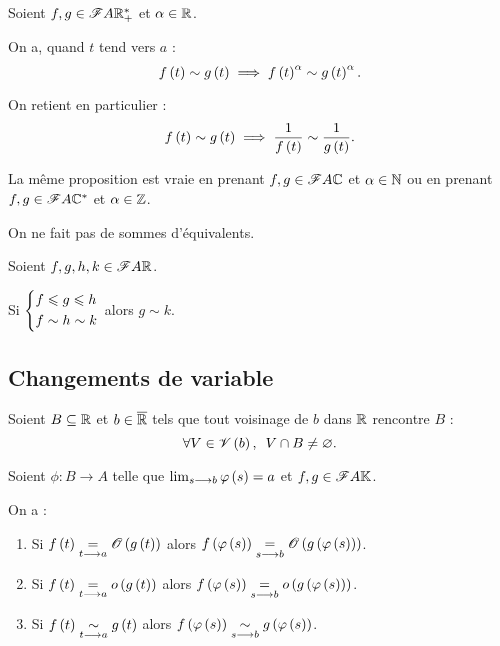 \begin{prop}[Puissances]
Soient \(f,g\in\F{A}{\Rps}\) et \(\alpha\in\R\).

On a, quand \(t\) tend vers \(a\) : \[f\paren{t}\sim g\paren{t}\imp f\paren{t}^\alpha\sim g\paren{t}^\alpha.\]

On retient en particulier : \[f\paren{t}\sim g\paren{t}\imp\dfrac{1}{f\paren{t}}\sim\dfrac{1}{g\paren{t}}.\]

La même proposition est vraie en prenant \(f,g\in\F{A}{\C}\) et \(\alpha\in\N\) ou en prenant \(f,g\in\F{A}{\Cs}\) et \(\alpha\in\Z\).
\end{prop}

\begin{prop}[Sommes]
On ne fait pas de sommes d'équivalents.
\end{prop}

\begin{prop}
Soient \(f,g,h,k\in\F{A}{\R}\).

Si \(\begin{dcases}
f\leq g\leq h \\
f\sim h\sim k
\end{dcases}\) alors \(g\sim k\).
\end{prop}

\subsection{Changements de variable}

\begin{prop}
Soient \(B\subset\R\) et \(b\in\Rb\) tels que tout voisinage de \(b\) dans \(\R\) rencontre \(B\) : \[\quantifs{\forall V\in\V{b}}V\inter B\not=\ensvide.\]

Soient \(\phi:B\to A\) telle que \(\lim_{s\to b}\phi\paren{s}=a\) et \(f,g\in\F{A}{\K}\).

On a :

\begin{enumerate}
    \item Si \(f\paren{t}\egqd{t\to a}\O{g\paren{t}}\) alors \(f\paren{\phi\paren{s}}\egqd{s\to b}\O{g\paren{\phi\paren{s}}}\). \\
    \item Si \(f\paren{t}\egqd{t\to a}\o{g\paren{t}}\) alors \(f\paren{\phi\paren{s}}\egqd{s\to b}\o{g\paren{\phi\paren{s}}}\). \\
    \item Si \(f\paren{t}\simqd{t\to a}g\paren{t}\) alors \(f\paren{\phi\paren{s}}\simqd{s\to b}g\paren{\phi\paren{s}}\).
\end{enumerate}
\end{prop}

